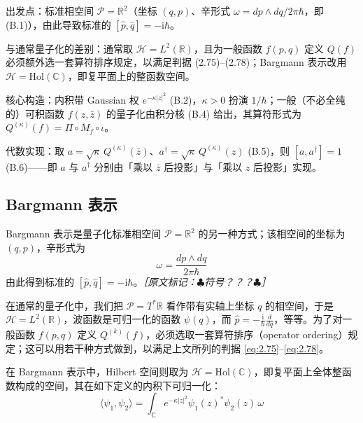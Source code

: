 \begin{keytakeaways}
  \item 出发点：标准相空间 $\mathcal{P}=\mathbb{R}^2$（坐标 $(q,p)$、辛形式 $\omega=dp\wedge dq/2\pi\hbar$，即 (B.1)），由此导致标准的 $[\hat{p},\hat{q}]=-\mathrm{i}\hbar$。
  \item 与通常量子化的差别：通常取 $\mathcal{H}=L^2(\mathbb{R})$，且为一般函数 $f(p,q)$ 定义 $Q(f)$ 必须额外选一套算符排序规定，以满足判据 (2.75)–(2.78)；Bargmann 表示改用 $\mathcal{H}=\mathrm{Hol}(\mathbb{C})$，即复平面上的整函数空间。
  \item 核心构造：内积带 Gaussian 权 $e^{-\kappa|z|^2}$ (B.2)，$\kappa>0$ 扮演 $1/\hbar$；一般（不必全纯的）可积函数 $f(z,\bar{z})$ 的量子化由积分核 (B.4) 给出，其算符形式为 $Q^{(\kappa)}(f)=\Pi\circ M_f\circ\iota$。
  \item 代数实现：取 $a=\sqrt{\kappa}\,Q^{(\kappa)}(\bar{z})$、$a^\dagger=\sqrt{\kappa}\,Q^{(\kappa)}(z)$ (B.5)，则 $[a,a^\dagger]=1$ (B.6)——即 $a$ 与 $a^\dagger$ 分别由「乘以 $\bar{z}$ 后投影」与「乘以 $z$ 后投影」实现。
\end{keytakeaways}

\subsection{Bargmann 表示} %

Bargmann 表示是量子化标准相空间 $\mathcal{P}=\mathbb{R}^2$ 的另一种方式；该相空间的坐标为 $(q,p)$，辛形式为
\begin{equation}
  \omega=\frac{dp\wedge dq}{2\pi\hbar}
  \tag{B.1}
  \label{eq:B.1}
\end{equation}
由此得到标准的 $[\hat{p},\hat{q}]=-\mathrm{i}\hbar$。{\small\itshape ［原文标记：$\clubsuit$符号？？？$\clubsuit$］}

在通常的量子化中，我们把 $\mathcal{P}=T^{*}\mathbb{R}$ 看作带有实轴上坐标 $q$ 的相空间，于是 $\mathcal{H}=L^2(\mathbb{R})$，波函数是可归一化的函数 $\psi(q)$，而 $\hat{p}=-\frac{\mathrm{i}}{\hbar}\frac{d}{dq}$，等等。为了对一般函数 $f(p,q)$ 定义 $Q^{(k)}(f)$，必须选取一套算符排序（operator ordering）规定；这可以用若干种方式做到，以满足上文所列的判据 \eqref{eq:2.75}–\eqref{eq:2.78}。

在 Bargmann 表示中，Hilbert 空间则取为 $\mathcal{H}=\mathrm{Hol}(\mathbb{C})$，即复平面上全体整函数构成的空间，其在如下定义的内积下可归一化：
\begin{equation}
  \langle\psi_1,\psi_2\rangle=\int_{\mathbb{C}}e^{-\kappa|z|^2}\psi_1(z)^{*}\psi_2(z)\,\omega
  \tag{B.2}
  \label{eq:B.2}
\end{equation}


